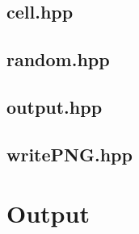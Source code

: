 \documentclass{article}
\begin{document}
\subsection{cell.hpp}


\subsection{random.hpp}


\subsection{output.hpp}


\subsection{writePNG.hpp}

\newpage

\section*{Output}
\end{document}
